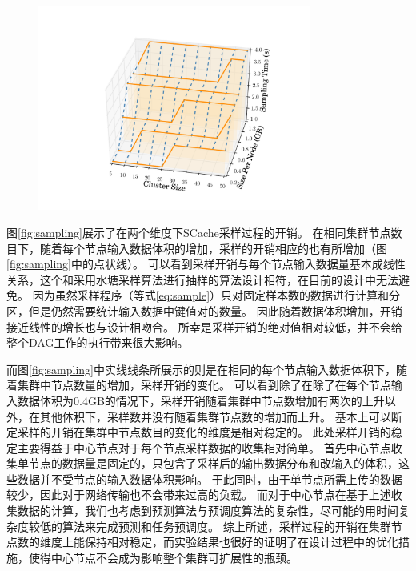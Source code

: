 \begin{figure}[!htp]
	\centering
	\includegraphics[width=0.8\textwidth]{../../PPoPP-2018/fig/sampling.pdf}
\end{figure}

图\ref{fig:sampling}展示了在两个维度下SCache采样过程的开销。
在相同集群节点数目下，随着每个节点输入数据体积的增加，采样的开销相应的也有所增加（图\ref{fig:sampling}中的点状线）。
可以看到采样开销与每个节点输入数据量基本成线性关系，这个和采用水塘采样算法进行抽样的算法设计相符，在目前的设计中无法避免。
因为虽然采样程序（等式\ref{eq:sample}）只对固定样本数的数据进行计算和分区，但是仍然需要统计输入数据中键值对的数量。
因此随着数据体积增加，开销接近线性的增长也与设计相吻合。
所幸是采样开销的绝对值相对较低，并不会给整个DAG工作的执行带来很大影响。

而图\ref{fig:sampling}中实线线条所展示的则是在相同的每个节点输入数据体积下，随着集群中节点数量的增加，采样开销的变化。
可以看到除了在除了在每个节点输入数据体积为0.4GB的情况下，采样开销随着集群中节点数增加有两次的上升以外，在其他体积下，采样数并没有随着集群节点数的增加而上升。
基本上可以断定采样的开销在集群中节点数目的变化的维度是相对稳定的。
此处采样开销的稳定主要得益于中心节点对于每个节点采样数据的收集相对简单。
首先中心节点收集单节点的数据量是固定的，只包含了采样后的输出数据分布和改输入的体积，这些数据并不受节点的输入数据体积影响。
于此同时，由于单节点所需上传的数据较少，因此对于网络传输也不会带来过高的负载。
而对于中心节点在基于上述收集数据的计算，我们也考虑到预测算法与预调度算法的复杂性，尽可能的用时间复杂度较低的算法来完成预测和任务预调度。
综上所述，采样过程的开销在集群节点数的维度上能保持相对稳定，而实验结果也很好的证明了在设计过程中的优化措施，使得中心节点不会成为影响整个集群可扩展性的瓶颈。

